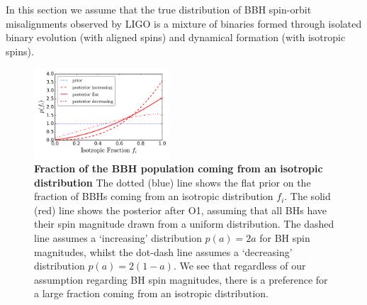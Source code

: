 \documentclass[modern,linenumbers]{aastex61}
\begin{document}
In this section we assume that the true distribution of BBH spin-orbit misalignments observed by LIGO is a mixture of binaries formed through isolated binary evolution (with aligned spins) and dynamical formation (with isotropic spins). 

%
\begin{figure}
\centering
\includegraphics[width=0.45\textwidth]{../plots/posterior_on_isotropic_fraction.png}
\caption{\textbf{Fraction of the BBH population coming from an isotropic distribution} The dotted (blue) line shows the flat prior on the fraction of BBHs coming from an isotropic distribution $f_i$. The solid (red) line shows the posterior after O1, assuming that all BHs have their spin magnitude drawn from a uniform distribution. The dashed line assumes a `increasing' distribution $p(a) = 2a$ for BH spin magnitudes, whilst the dot-dash line assumes a `decreasing' distribution $p(a) = 2(1-a)$. We see that regardless of our assumption regarding BH spin magnitudes, there is a preference for a large fraction coming from an isotropic distribution.}
\label{fig:mixture_fraction_posterior}
\end{figure}
%

%
\end{document}
